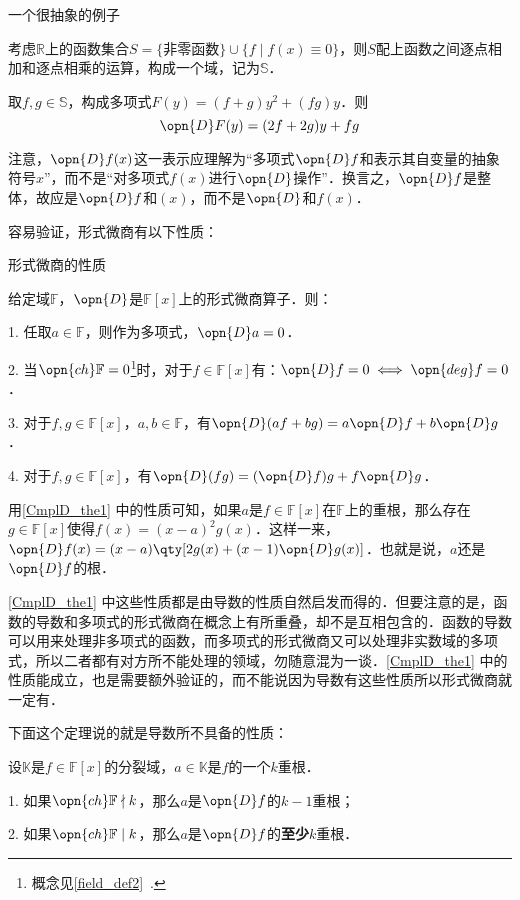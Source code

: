 \begin{example}{一个很抽象的例子}

考虑$\mathbb{R}$上的函数集合$S=\{\text{非零函数}\}\cup\{f\mid f(x)\equiv 0\}$，则$S$配上函数之间逐点相加和逐点相乘的运算，构成一个域，记为$\mathbb{S}$．

取$f, g\in\mathbb{S}$，构成多项式$F(y)=(f+g)y^2+(fg)y$．则
\begin{equation}
\opn{D}F(y) = (2f+2g)y+fg
\end{equation}

\end{example}

注意，$\opn{D}f(x)$这一表示应理解为“多项式$\opn{D}f$和表示其自变量的抽象符号$x$”，而不是“对多项式$f(x)$进行$\opn{D}$操作”．换言之，$\opn{D}f$是整体，故应是$\opn{D}f$和$(x)$，而不是$\opn{D}$和$f(x)$．

容易验证，形式微商有以下性质：

\begin{theorem}{形式微商的性质}\label{CmplD_the1}

给定域$\mathbb{F}$，$\opn{D}$是$\mathbb{F}[x]$上的形式微商算子．则：

1. 任取$a\in\mathbb{F}$，则作为多项式，$\opn{D}a=0$．

2. 当$\opn{ch}\mathbb{F}=0$\footnote{概念见\autoref{field_def2}~. }时，对于$f\in\mathbb{F}[x]$有：$\opn{D}f=0 \iff \opn{deg}f=0$．

3. 对于$f, g\in\mathbb{F}[x]$，$a, b\in\mathbb{F}$，有$\opn{D}(af+bg)=a\opn{D}f+b\opn{D}g$．

4. 对于$f, g\in\mathbb{F}[x]$，有$\opn{D}(fg) = (\opn{D}f)g+f\opn{D}g$．

\end{theorem}

用\autoref{CmplD_the1} 中的性质可知，如果$a$是$f\in\mathbb{F}[x]$在$\mathbb{F}$上的重根，那么存在$g\in\mathbb{F}[x]$使得$f(x)=(x-a)^2g(x)$．这样一来，$\opn{D}f(x)=(x-a)\qty[2g(x)+(x-1)\opn{D}g(x)]$．也就是说，$a$还是$\opn{D}f$的根．

\autoref{CmplD_the1} 中这些性质都是由导数的性质自然启发而得的．但要注意的是，函数的导数和多项式的形式微商在概念上有所重叠，却不是互相包含的．函数的导数可以用来处理非多项式的函数，而多项式的形式微商又可以处理非实数域的多项式，所以二者都有对方所不能处理的领域，勿随意混为一谈．\autoref{CmplD_the1} 中的性质能成立，也是需要额外验证的，而不能说因为导数有这些性质所以形式微商就一定有．

下面这个定理说的就是导数所不具备的性质：

\begin{theorem}{}\label{CmplD_the2}
设$\mathbb{K}$是$f\in\mathbb{F}[x]$的分裂域，$a\in\mathbb{K}$是$f$的一个$k$重根．

1. 如果$\opn{ch}\mathbb{F}\nmid k$，那么$a$是$\opn{D}f$的$k-1$重根；

2. 如果$\opn{ch}\mathbb{F}\mid k$，那么$a$是$\opn{D}f$的\textbf{至少}$k$重根．
\end{theorem}

